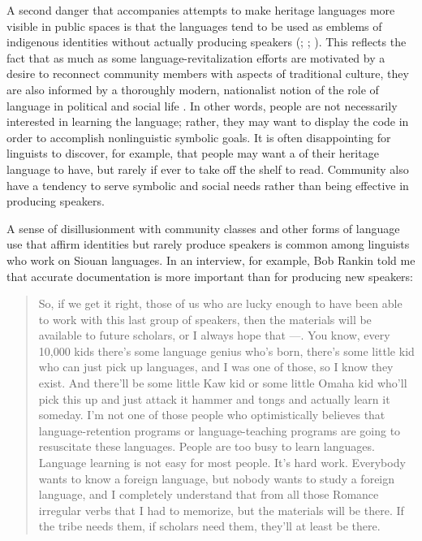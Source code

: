 \documentclass[output=paper]{LSP/langsci}
\begin{document}
A second danger that accompanies attempts to make heritage languages more visible in public spaces is that the languages tend to be used as emblems of indigenous identities without actually producing speakers (\citealt{Ahlers2006}; \citealt[98]{DauenhauerDauenhauer1998}; \citealt[715]{Whiteley2003}). This reflects the fact that as much as some language-revitalization efforts are motivated by a desire to reconnect community members with aspects of traditional culture, they are also informed by a thoroughly modern, nationalist notion of the role of language in political and social life \citep{KroskrityField2009, Nevins2013}. In other words, people are not necessarily interested in learning the language; rather, they may want to display the code in order to accomplish nonlinguistic symbolic goals. It is often disappointing for linguists to discover, for example, that people may want a  of their heritage language to have, but rarely if ever to take off the shelf to read. Community  also have a tendency to serve symbolic and social needs rather than being effective in producing speakers. 

A sense of disillusionment with community classes and other forms of language use that affirm identities but rarely produce speakers is common among linguists who work on Siouan languages. In an interview, for example, Bob Rankin told me that accurate documentation is more important than  for producing new speakers:

\begin{quote} So, if we get it right, those of us who are lucky enough to have been able to work with this last group of speakers, then the materials will be available to future scholars, or I always hope that ---. You know, every 10,000 kids there's some language genius who's born, there's some little kid who can just pick up languages, and I was one of those, so I know they exist. And there'll be some little Kaw kid or some little Omaha kid who'll pick this up and just attack it hammer and tongs and actually learn it someday. I'm not one of those people who optimistically believes that language-retention programs or language-teaching programs are going to resuscitate these languages. People are too busy to learn languages. Language learning is not easy for most people. It's hard work. Everybody wants to know a foreign language, but nobody wants to study a foreign language, and I completely understand that from all those Romance irregular verbs that I had to memorize, but the materials will be there. If the tribe needs them, if scholars need them, they'll at least be there.\end{quote}
\end{document}
